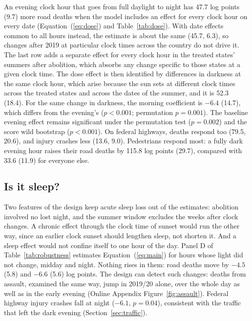 An evening clock hour that goes from full daylight to night has 47.7 log points (9.7) more road deaths when the model includes an effect for every clock hour on every date (Equation~(\ref{eq:dose}) and Table~\ref{tab:dose}). With date effects common to all hours instead, the estimate is about the same (45.7, 6.3), so changes after 2019 at particular clock times across the country do not drive it. The last row adds a separate effect for every clock hour in the treated states' summers after abolition, which absorbs any change specific to those states at a given clock time. The dose effect is then identified by differences in darkness at the same clock hour, which arise because the sun sets at different clock times across the treated states and across the dates of the summer, and it is 52.3 (18.4). For the same change in darkness, the morning coefficient is $-6.4$ (14.7), which differs from the evening's ($p<0.001$; permutation $p=0.001$). The baseline evening effect remains significant under the permutation test ($p=0.002$) and the score wild bootstrap ($p<0.001$). On federal highways, deaths respond too (79.5, 20.6), and injury crashes less (13.6, 9.0). Pedestrians respond most: a fully dark evening hour raises their road deaths by 115.8 log points (29.7), compared with 33.6 (11.9) for everyone else. %

\subsection{Is it sleep?}

Two features of the design keep acute sleep loss out of the estimates: abolition involved no lost night, and the summer window excludes the weeks after clock changes. A chronic effect through the clock time of sunset \citep{giuntella2019sunset} would run the other way, since an earlier clock sunset should lengthen sleep, not shorten it. And a sleep effect would not confine itself to one hour of the day. Panel D of Table~\ref{tab:robustness} estimates Equation~(\ref{eq:main}) for hours whose light did not change, midday and night. Nothing rises in them: road deaths move by $-4.5$ (5.8) and $-6.6$ (5.6) log points. The design can detect such changes: deaths from assault, examined the same way, jump in 2019/20 alone, over the whole day as well as in the early evening (Online Appendix Figure~\ref{fig:assault}). Federal highway injury crashes fall at night ($-6.1$, $p=0.04$), consistent with the traffic that left the dark evening (Section~\ref{sec:traffic}).

